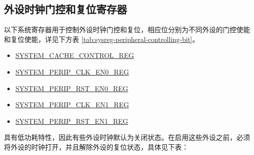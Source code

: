 \documentclass[main\_\_CN.tex]{subfiles}
\begin{document}
\subsection{外设时钟门控和复位寄存器}

以下系统寄存器用于控制外设时钟门控和复位，相应位分别为不同外设的门控使能和复位使能，详见下方表 \ref{tab:sysreg-peripheral-controlling-bit}。

\begin{itemize}
    \item \hyperref[regdesc:SYSTEMCACHECONTROLREG]{SYSTEM\_CACHE\_CONTROL\_REG}
    \item \hyperref[regdesc:SYSTEMPERIPCLKEN0REG]{SYSTEM\_PERIP\_CLK\_EN0\_REG}
    \item \hyperref[regdesc:SYSTEMPERIPRSTEN0REG]{SYSTEM\_PERIP\_RST\_EN0\_REG}
    \item \hyperref[regdesc:SYSTEMPERIPCLKEN1REG]{SYSTEM\_PERIP\_CLK\_EN1\_REG}
    \item \hyperref[regdesc:SYSTEMPERIPRSTEN1REG]{SYSTEM\_PERIP\_RST\_EN1\_REG}

\end{itemize}

\chipname{} 具有低功耗特性，因此有些外设时钟默认为关闭状态。在启用这些外设之前，必须将外设的时钟打开，并且解除外设的复位状态，具体见下表：
\end{document}

